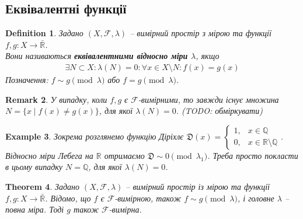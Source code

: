 \documentclass[a4paper, 10pt]{article}
\theoremstyle{theoremdd}
\newtheorem{theorem}{Theorem}[subsection]
\newtheorem{definition}[theorem]{Definition}
\newtheorem{example}[theorem]{Example}
\newtheorem{remark}[theorem]{Remark}
\begin{document}
\subsection{Еквівалентні функції}
\begin{definition}
Задано $(X,\mathcal{F},\lambda)$ -- вимірний простір з мірою та функції $f,g \colon X \to \bar{\mathbb{R}}$.\\
Вони називаються \textbf{еквівалентними відносно міри $\lambda$}, якщо
\begin{align*}
\exists N \subset X: \lambda(N) = 0: \forall x \in X \setminus N: f(x) = g(x)
\end{align*}
Позначення: $f \sim g \pmod \lambda$ або $f = g \pmod \lambda$.
\end{definition}

\begin{remark}
У випадку, коли $f,g$ є $\mathcal{F}$-вимірними, то завжди існує множина $N = \{x \mid f(x) \neq g(x)\}$, для якої $\lambda(N) = 0$. (\textit{TODO: обміркувати})
\end{remark}

\begin{example}
Зокрема розглянемо функцію Діріхлє $\mathfrak{D}(x) = \begin{cases} 1,& x \in \mathbb{Q} \\ 0, & x \in \mathbb{R} \setminus \mathbb{Q} \end{cases}$. Відносно міри Лебега на $\mathbb{R}$ отримаємо $\mathfrak{D} \sim 0 \pmod {\lambda_1}$. Треба просто покласти в цьому випадку $N = \mathbb{Q}$, для якої $\lambda(N) = 0$.
\end{example}

\begin{theorem}
Задано $(X,\mathcal{F},\lambda)$ -- вимірний простір із мірою та функції $f,g \colon X \to \bar{\mathbb{R}}$. Відомо, що $f$ є $\mathcal{F}$-вимірною, також $f \sim g \pmod \lambda$, і головне $\lambda$ -- повна міра. Тоді $g$ також $\mathcal{F}$-вимірна.
\end{theorem}
\end{document}
